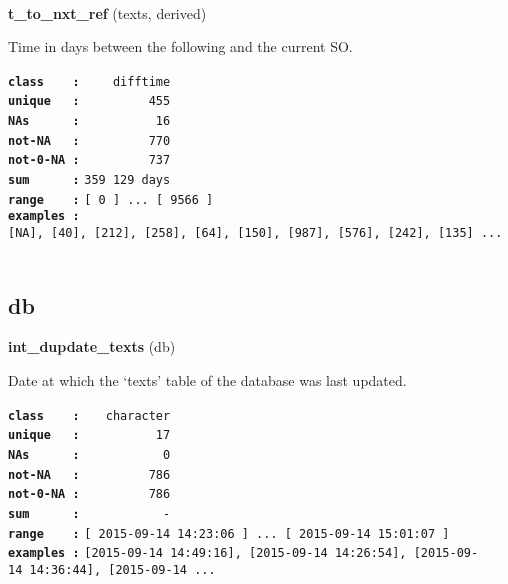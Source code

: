\documentclass[]{article}
\begin{document}
~

\textbf{t\_to\_nxt\_ref} (texts, derived)

Time in days between the following and the current SO.

\textbf{\texttt{class\ \ \ \ :}} \texttt{~~~~difftime}\\
\textbf{\texttt{unique\ \ \ :}} \texttt{~~~~~~~~~455}\\
\textbf{\texttt{NAs\ \ \ \ \ \ :}} \texttt{~~~~~~~~~~16}\\
\textbf{\texttt{not-NA\ \ \ :}} \texttt{~~~~~~~~~770}\\
\textbf{\texttt{not-0-NA\ :}} \texttt{~~~~~~~~~737}\\
\textbf{\texttt{sum\ \ \ \ \ \ :}} \texttt{359~129\ days}\\
\textbf{\texttt{range\ \ \ \ :}}
\texttt{{[}\ 0\ {]}\ ...\ {[}\ 9566\ {]}}\\
\textbf{\texttt{examples\ :}}
\texttt{{[}NA{]},\ {[}40{]},\ {[}212{]},\ {[}258{]},\ {[}64{]},\ {[}150{]},\ {[}987{]},\ {[}576{]},\ {[}242{]},\ {[}135{]}\ ...}\\

~

\subsection{db}\label{db}

\textbf{int\_dupdate\_texts} (db)

Date at which the `texts' table of the database was last updated.

\textbf{\texttt{class\ \ \ \ :}} \texttt{~~~character}\\
\textbf{\texttt{unique\ \ \ :}} \texttt{~~~~~~~~~~17}\\
\textbf{\texttt{NAs\ \ \ \ \ \ :}} \texttt{~~~~~~~~~~~0}\\
\textbf{\texttt{not-NA\ \ \ :}} \texttt{~~~~~~~~~786}\\
\textbf{\texttt{not-0-NA\ :}} \texttt{~~~~~~~~~786}\\
\textbf{\texttt{sum\ \ \ \ \ \ :}} \texttt{~~~~~~~~~~~-}\\
\textbf{\texttt{range\ \ \ \ :}}
\texttt{{[}\ 2015-09-14\ 14:23:06\ {]}\ ...\ {[}\ 2015-09-14\ 15:01:07\ {]}}\\
\textbf{\texttt{examples\ :}}
\texttt{{[}2015-09-14\ 14:49:16{]},\ {[}2015-09-14\ 14:26:54{]},\ {[}2015-09-14\ 14:36:44{]},\ {[}2015-09-14\ ...}\\

~
\end{document}
